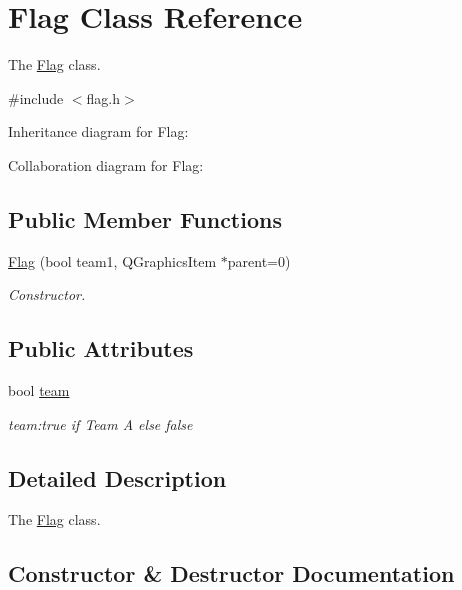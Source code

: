 \hypertarget{class_flag}{}\section{Flag Class Reference}
\label{class_flag}


The \hyperlink{class_flag}{Flag} class.  




{\ttfamily \#include $<$flag.\+h$>$}



Inheritance diagram for Flag\+:


Collaboration diagram for Flag\+:
\subsection*{Public Member Functions}
\begin{DoxyCompactItemize}
\item 
\hyperlink{class_flag_a71e55b65f2b6ba60b57cc8ff5820bb61}{Flag} (bool team1, Q\+Graphics\+Item $\ast$parent=0)
\begin{DoxyCompactList}\small\item\em Constructor. \end{DoxyCompactList}\end{DoxyCompactItemize}
\subsection*{Public Attributes}
\begin{DoxyCompactItemize}
\item 
bool \hyperlink{class_flag_a4268d838661176ddbcf17367aef1e81e}{team}\hypertarget{class_flag_a4268d838661176ddbcf17367aef1e81e}{}\label{class_flag_a4268d838661176ddbcf17367aef1e81e}

\begin{DoxyCompactList}\small\item\em team\+:true if Team A else false \end{DoxyCompactList}\end{DoxyCompactItemize}


\subsection{Detailed Description}
The \hyperlink{class_flag}{Flag} class. 

\subsection{Constructor \& Destructor Documentation}
